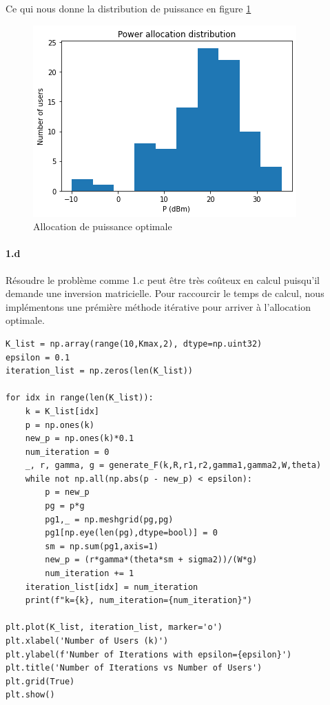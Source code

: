 \documentclass[a4paper,11pt,2]{article}
\begin{document}
Ce qui nous donne la distribution de puissance en figure \ref{fig:II1c}
\begin{figure}[h]
\centering
\includegraphics[width=0.7\linewidth]{./Images/II-1c.png}
\caption{Allocation de puissance optimale}
\label{fig:II1c}
\end{figure}

\paragraph{1.d} Résoudre le problème comme 1.c peut être très coûteux en calcul puisqu'il demande une inversion matricielle. Pour raccourcir le temps de calcul, nous implémentons une prémière méthode itérative pour arriver à l'allocation optimale.
\begin{center}
\begin{lstlisting}
K_list = np.array(range(10,Kmax,2), dtype=np.uint32)
epsilon = 0.1
iteration_list = np.zeros(len(K_list))

for idx in range(len(K_list)):
    k = K_list[idx]
    p = np.ones(k)
    new_p = np.ones(k)*0.1
    num_iteration = 0
    _, r, gamma, g = generate_F(k,R,r1,r2,gamma1,gamma2,W,theta)
    while not np.all(np.abs(p - new_p) < epsilon):
        p = new_p
        pg = p*g
        pg1,_ = np.meshgrid(pg,pg)
        pg1[np.eye(len(pg),dtype=bool)] = 0
        sm = np.sum(pg1,axis=1)
        new_p = (r*gamma*(theta*sm + sigma2))/(W*g)
        num_iteration += 1
    iteration_list[idx] = num_iteration
    print(f"k={k}, num_iteration={num_iteration}")

plt.plot(K_list, iteration_list, marker='o')
plt.xlabel('Number of Users (k)')
plt.ylabel(f'Number of Iterations with epsilon={epsilon}')
plt.title('Number of Iterations vs Number of Users')
plt.grid(True)
plt.show()
\end{lstlisting}
\end{center}
\end{document}
